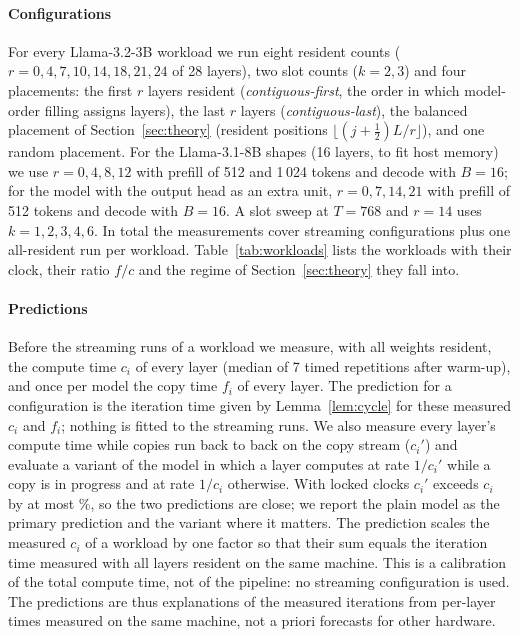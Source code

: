 \paragraph{Configurations}
For every Llama-3.2-3B workload we run eight resident counts ($r=0,4,7,10,14,18,21,24$ of 28 layers), two slot counts ($k=2,3$) and four placements: the first $r$ layers resident (\emph{contiguous-first}, the order in which model-order filling assigns layers), the last $r$ layers (\emph{contiguous-last}), the balanced placement of Section~\ref{sec:theory} (resident positions $\lfloor (j+\frac12)L/r\rfloor$), and one random placement. For the Llama-3.1-8B shapes (16 layers, to fit host memory) we use $r=0,4,8,12$ with prefill of 512 and 1\,024 tokens and decode with $B=16$; for the model with the output head as an extra unit, $r=0,7,14,21$ with prefill of 512 tokens and decode with $B=16$. A slot sweep at $T=768$ and $r=14$ uses $k=1,2,3,4,6$. In total the measurements cover \nAccN{} streaming configurations plus one all-resident run per workload. Table~\ref{tab:workloads} lists the workloads with their clock, their ratio $f/c$ and the regime of Section~\ref{sec:theory} they fall into.




\paragraph{Predictions}
Before the streaming runs of a workload we measure, with all weights resident, the compute time $c_i$ of every layer (median of 7 timed repetitions after warm-up), and once per model the copy time $f_i$ of every layer. The prediction for a configuration is the iteration time given by Lemma~\ref{lem:cycle} for these measured $c_i$ and $f_i$; nothing is fitted to the streaming runs. We also measure every layer's compute time while copies run back to back on the copy stream ($c_i'$) and evaluate a variant of the model in which a layer computes at rate $1/c_i'$ while a copy is in progress and at rate $1/c_i$ otherwise. With locked clocks $c_i'$ exceeds $c_i$ by at most \nConcInflationLockedPct\%, so the two predictions are close; we report the plain model as the primary prediction and the variant where it matters. The prediction scales the measured $c_i$ of a workload by one factor so that their sum equals the iteration time measured with all layers resident on the same machine. This is a calibration of the total compute time, not of the pipeline: no streaming configuration is used. The predictions are thus explanations of the measured iterations from per-layer times measured on the same machine, not a priori forecasts for other hardware.
